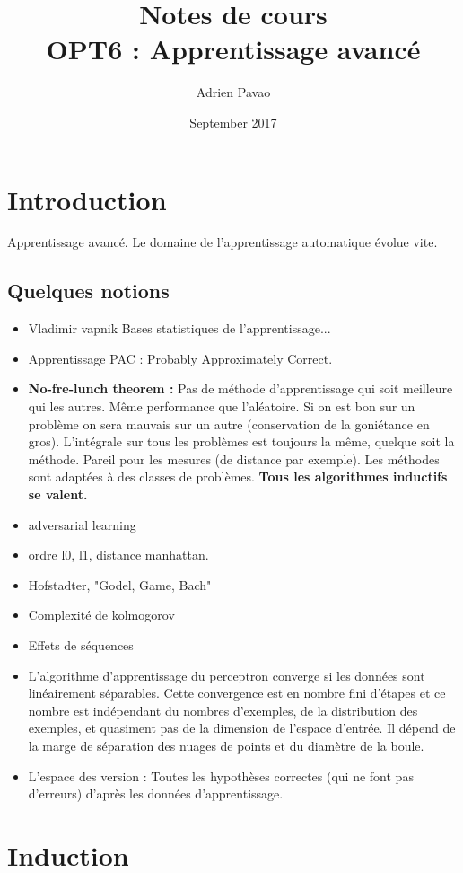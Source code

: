 \documentclass{article}
\title{Notes de cours\\OPT6 : Apprentissage avancé}
\author{Adrien Pavao}
\date{September 2017}
\begin{document}
\maketitle

\section{Introduction}

Apprentissage avancé. Le domaine de l'apprentissage automatique évolue vite.

\subsection{Quelques notions}
\begin{itemize}
\item Vladimir vapnik Bases statistiques de l'apprentissage...
\item Apprentissage PAC : Probably Approximately Correct.
\item \textbf{No-fre-lunch theorem :} Pas de méthode d'apprentissage qui soit meilleure qui les autres. Même performance que l'aléatoire. Si on est bon sur un problème on sera mauvais sur un autre (conservation de la goniétance en gros). L'intégrale sur tous les problèmes est toujours la même, quelque soit la méthode. Pareil pour les mesures (de distance par exemple). Les méthodes sont adaptées à des classes de problèmes. \textbf{Tous les algorithmes inductifs se valent.}
\item adversarial learning
\item ordre l0, l1, distance manhattan.
\item Hofstadter, "Godel, Game, Bach"
\item Complexité de kolmogorov
\item Effets de séquences
\item L'algorithme d'apprentissage du perceptron converge si les données sont linéairement séparables. Cette convergence est en nombre fini d'étapes et ce nombre est indépendant du nombres d'exemples, de la distribution des exemples, et quasiment pas de la dimension de l'espace d'entrée. Il dépend de la marge de séparation des nuages de points et du diamètre de la boule.
\item L'espace des version : Toutes les hypothèses correctes (qui ne font pas d'erreurs) d'après les données d'apprentissage.
\end{itemize}

\section{Induction}
\end{document}
